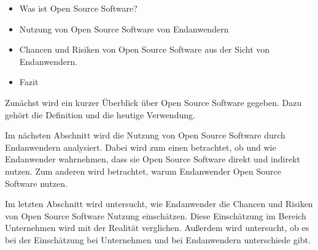 \documentclass[a4paper]{article}
\begin{document}
		\begin{itemize}
			\item Was ist Open Source Software?
			\item Nutzung von Open Source Software von Endanwendern
			\item Chancen und Risiken von Open Source Software aus der Sicht von Endanwendern.
			\item Fazit
		\end{itemize}
		
		Zunächst wird ein kurzer Überblick über Open Source Software gegeben. Dazu gehört die Definition und die heutige Verwendung.
		
		
		Im nächsten Abschnitt wird die Nutzung von Open Source Software durch Endanwendern analysiert. Dabei wird zum einen betrachtet, ob und wie Endanwender wahrnehmen, dass sie Open Source Software direkt und indirekt nutzen.
		Zum anderen wird betrachtet, warum Endanwender Open Source Software nutzen.
		
		Im letzten Abschnitt wird untersucht, wie Endanwender die Chancen und Risiken von Open Source Software Nutzung einschätzen.
		Diese Einschätzung im Bereich Unternehmen wird mit der Realität verglichen.
		Außerdem wird untersucht, ob es bei der Einschätzung bei Unternehmen und bei Endanwendern unterschiede gibt. %
	
        
    \clearpage
    \nocite{*}
    \printbibliography
\end{document}
